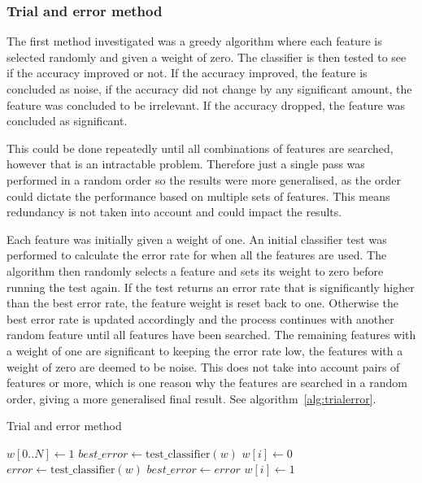 \subsubsection{Trial and error method}
The first method investigated was a greedy algorithm where each feature is selected randomly and given a weight of zero. The
classifier is then tested to see if the accuracy improved or not. If the accuracy improved, the feature is concluded as noise,
if the accuracy did not change by any significant amount, the feature was concluded to be irrelevant. If the accuracy dropped,
the feature was concluded as significant.

This could be done repeatedly until all combinations of features are searched, however that is an intractable problem. Therefore
just a single pass was performed in a random order so the results were more generalised, as the order could dictate the
performance based on multiple sets of features. This means redundancy is not taken into account and could impact the results.

Each feature was initially given a weight of one. An initial classifier test was performed to calculate the error rate for when
all the features are used. The algorithm then randomly selects a feature and sets its weight to zero before running the test again.
If the test returns an error rate that is significantly higher than the best error rate, the feature weight is reset back to one.
Otherwise the best error rate is updated accordingly and the process continues with another random feature until all features
have been searched. The remaining features with a weight of one are significant to keeping the error rate low, the features with a
weight of zero are deemed to be noise. This does not take into account pairs of features or more, which is one reason why the
features are searched in a random order, giving a more generalised final result.
See algorithm~\ref{alg:trialerror}.

\begin{algorithm}
    \caption{Trial and error method}
    \label{alg:trialerror}
    \begin{algorithmic}
        \STATE $w[0..N] \gets 1$
        \STATE $best\_ error \gets \mathrm{test\_ classifier}(w)$
            \STATE $w[i] \gets 0$
            \STATE $error \gets \mathrm{test\_ classifier}(w)$
                \STATE $best\_error \gets error$
                \STATE $w[i] \gets 1$
            \ENDIF
        \ENDFOR
    \end{algorithmic}
\end{algorithm}

